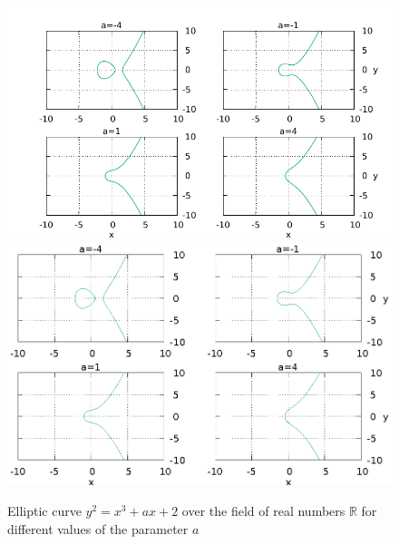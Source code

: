 \begin{figure}
\centering
\ifpdf
\includegraphics[angle=0]
{./add/discretmath/picelliptic.pdf}
\else
\includegraphics[angle=0]
{./add/discretmath/picelliptic.eps}
\fi
\caption{Elliptic curve $y^2 = x^3 + a x + 2$ over the field
  of real numbers $\mathbb{R}$ for different values of the parameter $a$}
\label{fig:add:ellipticR}
\end{figure}